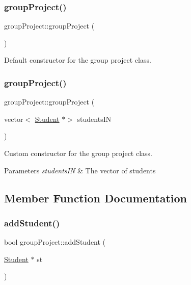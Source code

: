 \subsubsection{\texorpdfstring{group\+Project()}{groupProject()}\hspace{0.1cm}{\footnotesize\ttfamily [1/2]}}
{\footnotesize\ttfamily group\+Project\+::group\+Project (\begin{DoxyParamCaption}{ }\end{DoxyParamCaption})}



Default constructor for the group project class. 

\mbox{\label{classgroup_project_a6d21dcbab960c214631ddc4506351372}} 
\subsubsection{\texorpdfstring{group\+Project()}{groupProject()}\hspace{0.1cm}{\footnotesize\ttfamily [2/2]}}
{\footnotesize\ttfamily group\+Project\+::group\+Project (\begin{DoxyParamCaption}\item[{vector$<$ \hyperlink{class_student}{Student} $\ast$$>$}]{students\+IN }\end{DoxyParamCaption})}



Custom constructor for the group project class. 


\begin{DoxyParams}{Parameters}
{\em students\+IN} & The vector of students \\
\hline
\end{DoxyParams}


\subsection{Member Function Documentation}
\mbox{\label{classgroup_project_ab4e0a6d2a9add0cf2399674540ffb141}} 
\subsubsection{\texorpdfstring{add\+Student()}{addStudent()}}
{\footnotesize\ttfamily bool group\+Project\+::add\+Student (\begin{DoxyParamCaption}\item[{\hyperlink{class_student}{Student} $\ast$}]{st }\end{DoxyParamCaption})}



